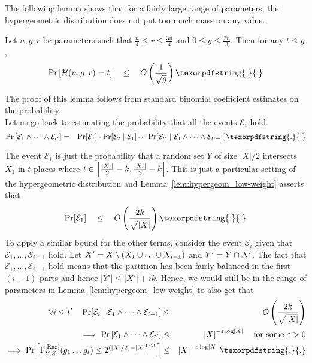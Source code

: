 \documentclass{birkjour}
\newcommand{\CM}[1]{\Gamma^{\mathrm{[#1]}}}
\newcommand{\spaced}[1]{\quad#1\quad}
\renewcommand{\epsilon}{\varepsilon}
\providecommand{\DIFaddtex}[1]{{\protect\color{blue}\uwave{#1}}} %
\providecommand{\DIFaddbegin}{} %
\providecommand{\DIFaddend}{} %
\providecommand{\DIFadd}[1]{\texorpdfstring{\DIFaddtex{#1}}{#1}} %
\begin{document}
The following lemma shows that for a fairly large range of parameters, the hypergeometric distribution does not put too much mass on any value.

\begin{lemma}\label{lem:hypergeom_low-weight}
  Let $n,g,r$ be parameters such that $\frac{n}{4} \leq r \leq \frac{3n}{4}$ and $0\leq g\leq \frac{2n}{3}$. Then for any $t\leq g$,
  $$
  \Pr\insquare{\mathcal{H}(n,g,r) = t} \spaced{\leq} O\inparen{\frac{1}{\sqrt{g}}}\DIFaddbegin \DIFadd{.
  }\DIFaddend $$
\end{lemma}
The proof of this lemma follows from standard binomial coefficient estimates on the probability.\\

Let us go back to estimating the probability that all the events $\mathcal{E}_i$ hold.
\begin{eqnarray*}
  \Pr\insquare{\mathcal{E}_1 \wedge \dots \wedge \mathcal{E}_{t'}} & = & \Pr[\mathcal{E}_1] \cdot \Pr[\mathcal{E}_2 \mid \mathcal{E}_1] \cdots \Pr[\mathcal{E}_{t'}\mid \mathcal{E}_1 \wedge \dots \wedge \mathcal{E}_{t'-1}]\DIFaddbegin \DIFadd{.
}\DIFaddend \end{eqnarray*}
The event $\mathcal{E}_1$ is just the probability that a random set $Y$ of size $|X|/2$ intersects $X_1$ in $t$ places where $t \in \left[\frac{|X_i|}{2} -k , \frac{|X_i|}{2} -k\right]$. This is just a particular setting of the hypergeometric distribution and Lemma~\ref{lem:hypergeom_low-weight} asserts that
$$
\Pr[\mathcal{E}_1] \spaced{\leq} O\inparen{\frac{2k}{\sqrt{|X|}}}\DIFaddbegin \DIFadd{.
}\DIFaddend $$
To apply a similar bound for the other terms, consider the event $\mathcal{E}_i$ given that $\mathcal{E}_1, \dots, \mathcal{E}_{i-1}$ hold. Let $X' = X \setminus (X_1 \union \dots \union X_{i-1})$ and $Y' = Y\cap X'$. The fact that $\mathcal{E}_1,\dots, \mathcal{E}_{i-1}$ hold means that the partition has been fairly balanced in the first $(i-1)$ parts and hence $|Y'| \leq |X'| + ik$. Hence, we would still be in the range of parameters in Lemma~\ref{lem:hypergeom_low-weight} to also get that
\begin{eqnarray*}
  \forall i\leq t'\quad \Pr[\mathcal{E}_i\mid \mathcal{E}_1 \wedge \cdots \wedge \mathcal{E}_{i-1}] &\leq& O\inparen{\frac{2k}{\sqrt{|X|}}}\\
  \implies \Pr\insquare{\mathcal{E}_1\wedge \dots \wedge \mathcal{E}_{t'}} & \leq & \abs{X}^{-\epsilon \log \abs{X}} \quad\text{for some $\epsilon > 0$}  \\
  \implies \Pr\insquare{\CM{Raz}_{Y,Z}(g_1\dots g_t) \leq 2^{(|X|/2) - |X|^{1/20}}} & \leq & \abs{X}^{-\epsilon \log \abs{X}}\DIFaddbegin \DIFadd{.
}\DIFaddend \end{eqnarray*}
\end{document}
